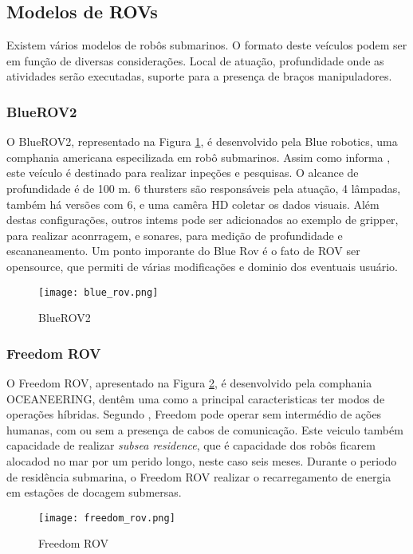 \subsection{Modelos de ROVs}

Existem vários modelos de robôs submarinos. O formato deste veículos podem ser em função de diversas considerações. Local de atuação, profundidade onde as atividades serão executadas, suporte para a presença de braços manipuladores.
\subsubsection{BlueROV2}


O BlueROV2, representado na Figura \ref{fig:blue}, é desenvolvido pela Blue robotics, uma comphania americana especilizada em robô submarinos. Assim como informa \cite{Bluerobotics}, este veículo é destinado para realizar inpeções e pesquisas. O alcance de profundidade é de 100 m. 6 thursters são responsáveis pela atuação, 4 lâmpadas, também há versões com 6, e uma camêra HD coletar os dados visuais. 
Além destas configurações, outros intems pode ser adicionados ao exemplo de gripper, para realizar aconrragem, e sonares, para medição de profundidade e escananeamento. Um ponto imporante do Blue Rov é o fato de ROV ser opensource,  que permiti de várias modificações e dominio dos eventuais usuário.

\begin{figure}
  \centering 
  \texttt{[image: blue\_rov.png]}
  \caption{BlueROV2}
  \label{fig:blue}
\end{figure}

\subsubsection{Freedom ROV}


O Freedom ROV, apresentado na Figura \ref{fig:freedom_rov}, é desenvolvido pela comphania OCEANEERING, dentêm uma como a principal caracteristicas ter modos de operações híbridas. Segundo \cite{Bogue1}, Freedom pode operar sem intermédio de ações humanas, com ou sem a presença de cabos de comunicação. Este veiculo também capacidade de realizar \textit{subsea residence}, que é capacidade dos robôs ficarem alocadod no mar por um perido longo, neste caso seis meses. Durante o periodo de residência submarina, o Freedom ROV realizar o recarregamento de energia em estações de docagem submersas.


\begin{figure}
  \centering 
  \texttt{[image: freedom\_rov.png]}
  \caption{Freedom ROV}
  \label{fig:freedom_rov}
\end{figure}

